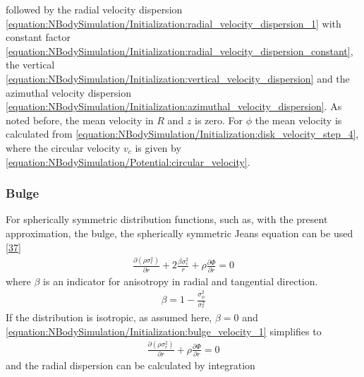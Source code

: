 \documentclass[letterpaper,10pt,english]{sphinxmanual}
\begin{document}
					followed by the radial velocity dispersion \eqref{equation:NBodySimulation/Initialization:radial_velocity_dispersion_1} with constant factor \eqref{equation:NBodySimulation/Initialization:radial_velocity_dispersion_constant}, the vertical \eqref{equation:NBodySimulation/Initialization:vertical_velocity_dispersion} and the azimuthal velocity dispersion \eqref{equation:NBodySimulation/Initialization:azimuthal_velocity_dispersion}.
					As noted before, the mean velocity in \(R\) and \(z\) is zero. For \(\phi\) the mean velocity is calculated from \eqref{equation:NBodySimulation/Initialization:disk_velocity_step_4}, where the circular velocity \(v_c\) is given by \eqref{equation:NBodySimulation/Potential:circular_velocity}.
					
				
				\subsubsection{Bulge}
					\label{\detokenize{NBodySimulation/Initialization:bulge}}
					\sphinxAtStartPar
					For spherically symmetric distribution functions, such as, with the present approximation, the bulge, the spherically symmetric Jeans equation can be used {[}\hyperlink{cite.NBodySimulation/Appendix:id20}{37}{]}
					\begin{equation}\label{equation:NBodySimulation/Initialization:bulge_velocity_1}
					\begin{split}\frac{\partial (\rho \sigma_r^2)}{\partial r} + 2\frac{\beta\sigma_r^2}{r} + \rho\frac{\partial \Phi}{\partial r} = 0\end{split}
					\end{equation}
					\sphinxAtStartPar
					where \(\beta\) is an indicator for anisotropy in radial and tangential direction.
					\begin{equation*}
					\begin{split}\beta = 1 - \frac{\sigma^2_\phi}{\sigma^2_r}\end{split}
					\end{equation*}
					\sphinxAtStartPar
					If the distribution is isotropic, as assumed here, \(\beta=0\) and \eqref{equation:NBodySimulation/Initialization:bulge_velocity_1} simplifies to
					\begin{equation*}
					\begin{split}\frac{\partial (\rho \sigma_r^2)}{\partial r} +  \rho\frac{\partial \Phi}{\partial r} = 0\end{split}
					\end{equation*}
					\sphinxAtStartPar
					and the radial dispersion can be calculated by integration
\end{document}
